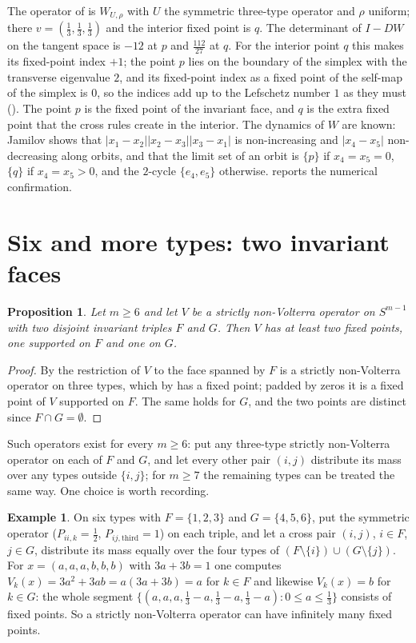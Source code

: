 \documentclass[11pt]{amsart}
\newtheorem{proposition}[theorem]{Proposition}
\theoremstyle{definition}
\newtheorem{example}[theorem]{Example}
\newcommand{\Simp}{S^{m-1}}
\begin{document}
The operator of  is $W_{U,\rho}$ with $U$ the symmetric three-type operator and $\rho$ uniform; there $v=(\frac13,\frac13,\frac13)$ and the interior fixed point is $q$. The determinant of $I-DW$ on the tangent space is $-12$ at $p$ and $\frac{112}{27}$ at $q$. For the interior point $q$ this makes its fixed-point index $+1$; the point $p$ lies on the boundary of the simplex with the transverse eigenvalue $2$, and its fixed-point index as a fixed point of the self-map of the simplex is $0$, so the indices add up to the Lefschetz number $1$ as they must (). The point $p$ is the fixed point of the invariant face, and $q$ is the extra fixed point that the cross rules create in the interior. The dynamics of $W$ are known: Jamilov \cite[Theorems 4 and 5]{Jam17} shows that $|x_1-x_2||x_2-x_3||x_3-x_1|$ is non-increasing and $|x_4-x_5|$ non-decreasing along orbits, and that the limit set of an orbit is $\{p\}$ if $x_4=x_5=0$, $\{q\}$ if $x_4=x_5>0$, and the $2$-cycle $\{e_4,e_5\}$ otherwise.  reports the numerical confirmation.

\section{Six and more types: two invariant faces}\label{sec:six}

\begin{proposition}\label{prop:six}
Let $m\ge6$ and let $V$ be a strictly non-Volterra operator on $\Simp$ with two disjoint invariant triples $F$ and $G$. Then $V$ has at least two fixed points, one supported on $F$ and one on $G$.
\end{proposition}

\begin{proof}
By  the restriction of $V$ to the face spanned by $F$ is a strictly non-Volterra operator on three types, which by  has a fixed point; padded by zeros it is a fixed point of $V$ supported on $F$. The same holds for $G$, and the two points are distinct since $F\cap G=\emptyset$.
\end{proof}

Such operators exist for every $m\ge6$: put any three-type strictly non-Volterra operator on each of $F$ and $G$, and let every other pair $(i,j)$ distribute its mass over any types outside $\{i,j\}$; for $m\ge7$ the remaining types can be treated the same way. One choice is worth recording.

\begin{example}\label{ex:segment}
On six types with $F=\{1,2,3\}$ and $G=\{4,5,6\}$, put the symmetric operator ($P_{ii,k}=\frac12$, $P_{ij,\text{third}}=1$) on each triple, and let a cross pair $(i,j)$, $i\in F$, $j\in G$, distribute its mass equally over the four types of $(F\setminus\{i\})\cup(G\setminus\{j\})$. For $x=(a,a,a,b,b,b)$ with $3a+3b=1$ one computes $V_k(x)=3a^2+3ab=a(3a+3b)=a$ for $k\in F$ and likewise $V_k(x)=b$ for $k\in G$: the whole segment $\{(a,a,a,\frac13-a,\frac13-a,\frac13-a):0\le a\le\frac13\}$ consists of fixed points. So a strictly non-Volterra operator can have infinitely many fixed points.
\end{example}
\end{document}
